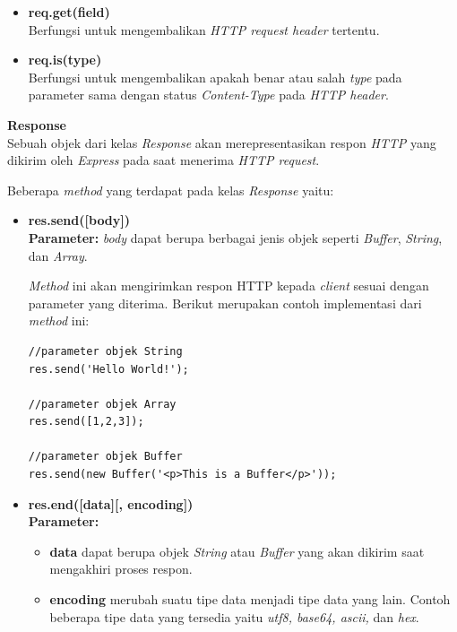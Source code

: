 \documentclass[a4paper,twoside]{article}
\begin{document}
\begin{enumerate}
\begin{enumerate}
\begin{itemize}
				\item \textbf{req.get(field)} \\ Berfungsi untuk mengembalikan \textit{HTTP request header} tertentu.
				
				\item \textbf{req.is(type)} \\ Berfungsi untuk mengembalikan apakah benar atau salah \textit{type} pada parameter sama dengan status \textit{Content-Type} pada \textit{HTTP header}.
			\end{itemize}
			
			
			\textbf{Response} \\
			Sebuah objek dari kelas \textit{Response} akan merepresentasikan respon \textit{HTTP} yang dikirim oleh \textit{Express} pada saat menerima \textit{HTTP request}.
			
			Beberapa \textit{method} yang terdapat pada kelas \textit{Response} yaitu: 
			
			\begin{itemize}
				\item \textbf{res.send([body])} \\ \textbf{Parameter:} \textit{body} dapat berupa berbagai jenis objek seperti \textit{Buffer}, \textit{String}, dan \textit{Array}.
				
				\textit{Method} ini akan mengirimkan respon HTTP kepada \textit{client} sesuai dengan parameter yang diterima. Berikut merupakan contoh implementasi dari \textit{method} ini:
\begin{lstlisting}
//parameter objek String
res.send('Hello World!');
				
//parameter objek Array
res.send([1,2,3]);
				
//parameter objek Buffer
res.send(new Buffer('<p>This is a Buffer</p>'));
\end{lstlisting}
				
				\item \textbf{res.end([data][, encoding])} \\ \textbf{Parameter:}
				\begin{itemize}
					\item \textbf{data} dapat berupa objek \textit{String} atau \textit{Buffer} yang akan dikirim saat mengakhiri proses respon.
					\item \textbf{encoding} merubah suatu tipe data menjadi tipe data yang lain. Contoh beberapa tipe data yang tersedia yaitu \textit{utf8, base64, ascii, } dan \textit{hex}.
				\end{itemize}
				

\end{itemize}
\end{enumerate}
\end{enumerate}
\end{document}
